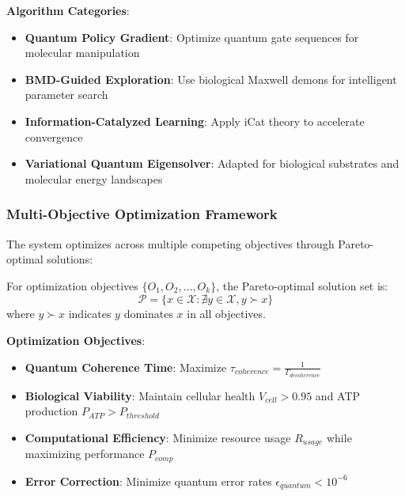 \documentclass[11pt,a4paper]{article}
\begin{document}
\textbf{Algorithm Categories}:
\begin{itemize}
\item \textbf{Quantum Policy Gradient}: Optimize quantum gate sequences for molecular manipulation
\item \textbf{BMD-Guided Exploration}: Use biological Maxwell demons for intelligent parameter search
\item \textbf{Information-Catalyzed Learning}: Apply iCat theory to accelerate convergence
\item \textbf{Variational Quantum Eigensolver}: Adapted for biological substrates and molecular energy landscapes
\end{itemize}

\subsubsection{Multi-Objective Optimization Framework}

The system optimizes across multiple competing objectives through Pareto-optimal solutions:

\begin{definition}
For optimization objectives $\{O_1, O_2, \ldots, O_k\}$, the Pareto-optimal solution set is:
\begin{equation}
\mathcal{P} = \{x \in \mathcal{X} : \nexists y \in \mathcal{X}, y \succ x\}
\end{equation}
where $y \succ x$ indicates $y$ dominates $x$ in all objectives.
\end{definition}

\textbf{Optimization Objectives}:
\begin{itemize}
\item \textbf{Quantum Coherence Time}: Maximize $\tau_{coherence} = \frac{1}{\Gamma_{decoherence}}$
\item \textbf{Biological Viability}: Maintain cellular health $V_{cell} > 0.95$ and ATP production $P_{ATP} > P_{threshold}$
\item \textbf{Computational Efficiency}: Minimize resource usage $R_{usage}$ while maximizing performance $P_{comp}$
\item \textbf{Error Correction}: Minimize quantum error rates $\epsilon_{quantum} < 10^{-6}$
\end{itemize}
\end{document}
